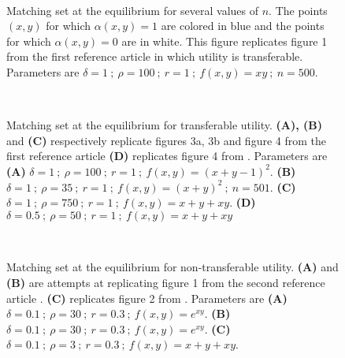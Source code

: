 \def \smallScl {0.15}
\def \mediumScl {0.2}
\def \largeScl {0.3}



\begin{figure}[!ht]
	\centering
	\quad
	\quad
	\\
	\caption{Matching set at the equilibrium for several values of $n$. The points $(x,y)$ for which $\alpha(x,y)=1$ are colored in blue and the points for which $\alpha(x,y)=0$ are in white. This figure replicates figure 1 from the first reference article \citep{shimer_assortative_2000} in which utility is transferable. Parameters are $\delta=1 \ ; \ \rho=100 \ ; \ r=1 \ ; \ f(x,y)=xy \ ; \ n=500$.}
	\label{fig:fig1}
\end{figure}

 

\begin{figure}[!ht]
	\centering
	\quad
	\\
	\quad
	\caption{Matching set at the equilibrium for transferable utility. \textbf{(A), (B)} and \textbf{(C)} respectively replicate figures 3a, 3b and figure 4 from the first reference article \citep{shimer_assortative_2000} \textbf{(D)} replicates figure 4 from \citep{smith_frictional_2011}. Parameters are \textbf{(A)} $\delta=1 \ ; \ \rho=100 \ ; \ r=1 \ ; \ f(x,y)=(x+y-1)^2$. \textbf{(B)} $\delta=1 \ ; \ \rho=35 \ ; \ r=1 \ ; \ f(x,y)=(x+y)^2 \ ; \ n=501$. \textbf{(C)} $\delta=1 \ ; \ \rho=750 \ ; \ r=1 \ ; \ f(x,y)=x+y+xy$. \textbf{(D)} $\delta=0.5 \ ; \ \rho=50 \ ; \ r=1 \ ; \ f(x,y)=x+y+xy$}
	\label{fig:fig2}
\end{figure}





\begin{figure}[!ht]
	\centering
	\quad
	\\
	\caption{Matching set at the equilibrium for non-transferable utility. \textbf{(A)} and \textbf{(B)} are attempts at replicating figure 1 from the second reference article \citep{smith_marriage_2006}. \textbf{(C)} replicates figure 2 from \citep{smith_marriage_2006}. Parameters are \textbf{(A)} $\delta=0.1 \ ; \ \rho=30 \ ; \ r=0.3 \ ; \ f(x,y)=e^{xy}$. \textbf{(B)} $\delta=0.1 \ ; \ \rho=30 \ ; \ r=0.3 \ ; \ f(x,y)=e^{xy}$. \textbf{(C)} $\delta=0.1 \ ; \ \rho=3 \ ; \ r=0.3 \ ; \ f(x,y)=x+y+xy$.}
	\label{fig:fig3}
\end{figure}
 




